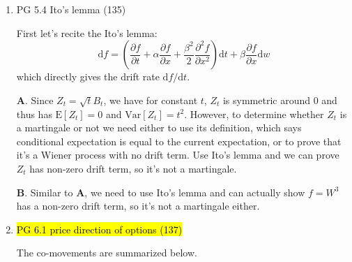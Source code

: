 \documentclass[11pt]{article}
\newcommand{\E}{\text{E}}
\newcommand{\Var}{\text{Var}}
\renewcommand{\P}{\text{P}}
\renewcommand{\d}{\text{d}}
\newenvironment{note}{\begin{enumerate}[leftmargin=1em,topsep=0pt,noitemsep]}{\end{enumerate}}
\newcommand{\solution}{\boxed{\textbf{SOLUTION}}\hspace{.5em}}
\begin{document}
\begin{spacing}{1.1}
\begin{note}
      \textbf{C}. Assume the probability of hitting $3$ first is $\P_3$, then since $B_T$ is a martingale for $T$ being the first passage time, we know $3\P_3 + (-5)(1- \P_3)=0$ which gives $\P_3 = 5/8$. Generally, we have $\P_{\alpha}=\alpha/(\alpha + \beta)$. For $B_t=W_t+mt$, since $\exp(\lambda W_t + \lambda^2t/2)$ is a martingale (see exponential martingale), we know $X_t = \exp(\lambda B_t + \lambda^2t/2)$ is also a martingale and thus $\E[X_t]=0$. Notice this holds for any $\lambda$ and thus we can let $\lambda = -2m$, which gives $\E[X_t] = \E[\exp(-2mB_t)]=1$. We know a martingale stopped at the stopping time is also a martingale, i.e. $X_T$ is still a martingale for $T$ being the time first $B_t$ hits $3$ or $-5$, so $\E[X_T] = \E[\exp(-2mB_T)]=\P_3\exp(-2m\cdot 3) + (1-\P_3)\exp(2m\cdot 5) = \P_3\exp(-6m)+(1-\P_3)\exp(10m)=1$. Therefore, we have $\P_3 = \frac{\exp(10m)-1}{\exp(10m)-\exp(-6m)}$.

      \textbf{D}. Again we have $\E[\exp(-2mB_t)]=1$ while here we have $m=1$, and thus $\E[\exp(-2B_t)]=\P_{-1}\exp(2) + (1-\P_{-1})\exp(-\infty)=\exp(2)\P_{-2}=1$. So $\P_{-1}=\exp(-2)$.

\item PG 5.4 Ito's lemma (135) 
      
      \solution First let's recite the Ito's lemma:
      $$
      \d f = \left(\frac{\partial f}{\partial t} + \alpha \frac{\partial f}{\partial x} + \frac{\beta^2}{2}\frac{\partial^2 f}{\partial x^2}\right)\d t + \beta \frac{\partial f}{\partial x}\d w
      $$
      which directly gives the drift rate $\d f / \d t$.

      \textbf{A}. Since $Z_t  = \sqrt{t}B_t$, we have for constant $t$, $Z_t$ is symmetric around $0$ and thus has $\E[Z_t]=0$ and $\Var[Z_t]=t^2$. However, to determine whether $Z_t$ is a martingale or not we need either to use its definition, which says conditional expectation is equal to the current expectation, or to prove that it's a Wiener process with no drift term. Use Ito's lemma and we can prove $Z_t$ has non-zero drift term, so it's not a martingale.

      \textbf{B}. Similar to $\textbf{A}$, we need to use Ito's lemma and can actually show $f=W^3$ has a non-zero drift term, so it's not a martingale either.

\item \hl{PG 6.1 price direction of options (137)}

      \solution The co-movements are summarized below.
      

\end{note}
\end{spacing}
\end{document}
